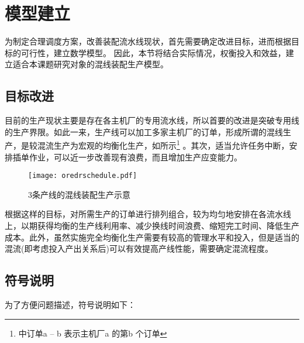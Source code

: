 \section{模型建立}
为制定合理调度方案，改善装配流水线现状，首先需要确定改进目标，进而根据目标的可行性，建立数学模型。
因此，本节将结合实际情况，权衡投入和效益，建立适合本课题研究对象的混线装配生产模型。
\subsection{目标改进}
目前的生产现状主要是存在各主机厂的专用流水线，所以首要的改进是突破专用线的生产界限。如此一来，生产线可以加工多家主机厂的订单，形成所谓的混线生产，是较混流生产为宏观的均衡化生产，如所示\footnote{中订单a -- b 表示主机厂a 的第b 个订单}
。其次，适当允许任务中断，安排插单作业，可以近一步改善现有浪费，而且增加生产应变能力。
\begin{figure}[h]
\centering
\texttt{[image: oredrschedule.pdf]}
\caption{3条产线的混线装配生产示意\label{fig:orderschedule}}
\end{figure}

根据这样的目标，对所需生产的订单进行排列组合，较为均匀地安排在各流水线上，以期获得均衡的生产线利用率、减少换线时间浪费、缩短完工时间、降低生产成本。此外，虽然实施完全均衡化生产需要有较高的管理水平和投入，但是适当的混流(即考虑投入产出关系后)可以有效提高产线性能，需要确定混流程度。
\subsection{符号说明}
为了方便问题描述，符号说明如下：%

